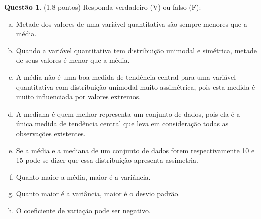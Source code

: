 \documentclass[a4paper,11pt]{article}
\theoremstyle{definition}
\newtheorem{exe}{Questão}
\begin{document}
\medskip
\begin{exe} (1,8 pontos) 
Responda verdadeiro (V) ou falso (F):
\begin{enumerate}[(a) (\quad)]
  \item Metade dos valores de uma variável quantitativa são sempre menores que a média. %
  \item Quando a variável quantitativa tem distribuição unimodal e simétrica, metade de seus valores é menor que a média. %
  \item A média não é uma boa medida de tendência central para uma variável quantitativa com distribuição unimodal muito assimétrica, pois esta medida é muito influenciada por valores extremos. %
  \item A mediana é quem melhor representa um conjunto de dados, pois ela é a única medida de tendência central que leva em consideração todas as observações existentes.  %
  \item Se a média e a mediana de um conjunto de dados forem respectivamente 10 e 15 pode-se dizer que essa distribuição apresenta assimetria. %
  \item Quanto maior a média, maior é a variância. %
  \item Quanto maior é a variância, maior é o desvio padrão. %
  \item O coeficiente de variação pode ser negativo. %
\end{enumerate}
\end{exe}
\end{document}
